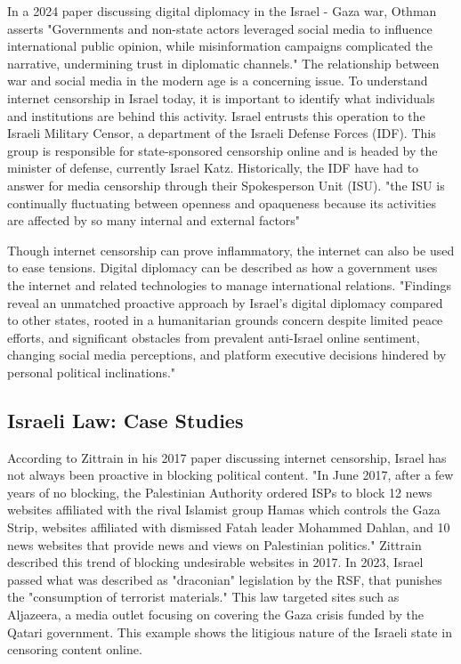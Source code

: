In a 2024 paper discussing digital diplomacy in the Israel - Gaza war, Othman asserts "Governments and non-state actors leveraged social media to influence international public opinion, while misinformation campaigns complicated the narrative, undermining trust in diplomatic channels." \cite{Othman2025DigitalDiplomacy} The relationship between war and social media in the modern age is a concerning issue. To understand internet censorship in Israel today, it is important to identify what individuals and institutions are behind this activity. Israel entrusts this operation to the Israeli Military Censor, a department of the Israeli Defense Forces (IDF). This group is responsible for state-sponsored censorship online and is headed by the minister of defense, currently Israel Katz.\cite{MOD_Israel} Historically, the IDF have had to answer for media censorship through their Spokesperson Unit (ISU). "the ISU is continually fluctuating between openness and opaqueness because its activities are affected by so many internal and external factors" \cite{MAGEN2018287} 

Though internet censorship can prove inflammatory, the internet can also be used to ease tensions. Digital diplomacy can be described as how a government uses the internet and related technologies to manage international relations. "Findings reveal an unmatched proactive approach by Israel’s digital diplomacy compared to other states, rooted in a humanitarian grounds concern despite limited peace efforts, and significant obstacles from prevalent anti-Israel online sentiment, changing social media perceptions, and platform executive decisions hindered by personal political inclinations." \cite{Othman2025DigitalDiplomacy} 

\subsection{Israeli Law: Case Studies}
According to Zittrain in his 2017 paper discussing internet censorship, Israel has not always been proactive in blocking political content. "In June 2017, after a few years of no blocking, the Palestinian Authority ordered ISPs to block 12 news websites affiliated with the rival Islamist group Hamas which controls the Gaza Strip, websites affiliated with dismissed Fatah leader Mohammed Dahlan, and 10 news websites that provide news and views on Palestinian politics." \cite{zittrain2017shifting} Zittrain described this trend of blocking undesirable websites in 2017. In 2023, Israel passed what was described as "draconian" legislation by the RSF, that punishes the "consumption of terrorist materials." \cite{RSF2024IsraelCensorship} This law targeted sites such as Aljazeera, a media outlet focusing on covering the Gaza crisis funded by the Qatari government. \cite{AlJazeera2023Knesset} This example shows the litigious nature of the Israeli state in censoring content online. 

